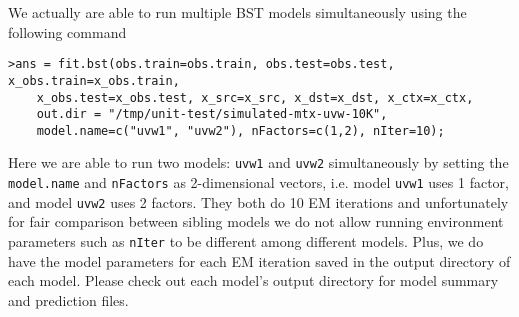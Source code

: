 We actually are able to run multiple BST models simultaneously using the following command
{\small\begin{verbatim}
>ans = fit.bst(obs.train=obs.train, obs.test=obs.test, x_obs.train=x_obs.train, 
	x_obs.test=x_obs.test, x_src=x_src, x_dst=x_dst, x_ctx=x_ctx,
	out.dir = "/tmp/unit-test/simulated-mtx-uvw-10K", 
	model.name=c("uvw1", "uvw2"), nFactors=c(1,2), nIter=10);
\end{verbatim}}
Here we are able to run two models: {\tt uvw1} and {\tt uvw2} simultaneously by setting the {\tt model.name} and {\tt nFactors} as  2-dimensional vectors, i.e. model {\tt uvw1} uses 1 factor, and model {\tt uvw2} uses 2 factors. They both do 10 EM iterations and unfortunately for fair comparison between sibling models we do not allow running environment parameters such as {\tt nIter} to be different among different models. Plus, we do have the model parameters for each EM iteration saved in the output directory of each model. Please check out each model's output directory for model summary and prediction files.

